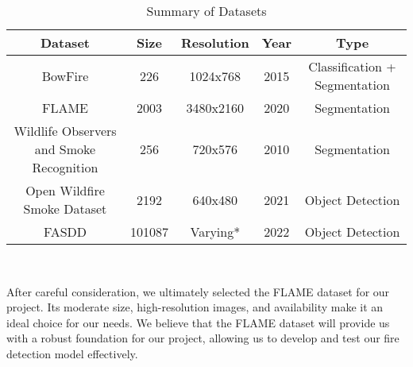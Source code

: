 \begin{table*}[!htbp]
    \caption{Summary of Datasets}
    \centering
    \begin{tabular}{c|c|c|c|c}
         \hline
        \textbf{Dataset} & \textbf{Size} & \textbf{Resolution} & \textbf{Year} & \textbf{Type} \\
        \hline
        
        BowFire & 226 & 1024x768 & 2015 & Classification + Segmentation \\
        \hline
        FLAME & 2003 & 3480x2160 & 2020 & Segmentation \\ 
        \hline
        Wildlife Observers and Smoke Recognition & 256 & 720x576 & 2010 & Segmentation \\
        \hline
        Open Wildfire Smoke Dataset & 2192 & 640x480 & 2021 & Object Detection \\
        \hline
        FASDD & 101087 & Varying* & 2022 & Object Detection \\
        \hline 
    \end{tabular}
    \label{tab:datasets}
\end{table*}

\

\noindent After careful consideration, we ultimately selected the FLAME dataset for our project. Its moderate size, high-resolution images, and availability make it an ideal choice for our needs. We believe that the FLAME dataset will provide us with a robust foundation for our project, allowing us to develop and test our fire detection model effectively.